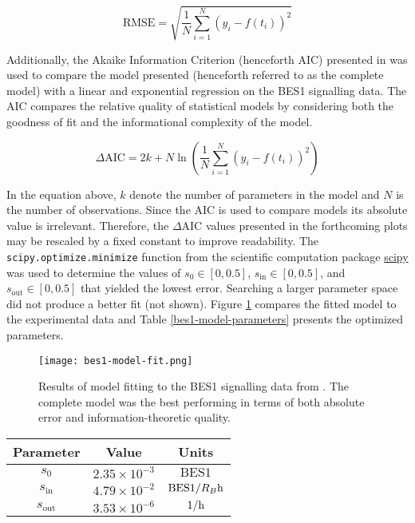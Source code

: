 \begin{equation}
\label{rmse}
\text{RMSE} =  \sqrt{\frac{1}{N}\sum_{i = 1}^{N} (y_{i} - f(t_{i}))^{2}}
\end{equation}


Additionally, the Akaike Information Criterion (henceforth AIC) presented in \cite{akaike1974} was used to compare the model presented (henceforth referred to as the complete model) with a linear and exponential regression on the BES1 signalling data. The AIC compares the relative quality of statistical models by considering both the goodness of fit and the informational complexity of the model. 

\begin{equation}
\label{aic}
\Delta \text{AIC} = 2k + N \ln\left( \frac{1}{N} \sum_{i = 1}^{N} (y_{i} - f(t_{i}))^{2}  \right) 
\end{equation}

In the equation above, $k$ denote the number of parameters in the model and $N$ is the number of observations. Since the AIC is used to compare models its absolute value is irrelevant. Therefore, the $\Delta \text{AIC}$ values presented in the forthcoming plots may be rescaled by a fixed constant to improve readability. The \verb|scipy.optimize.minimize| function from the scientific computation package \href{https://scipy.org/}{scipy} was used to determine the values of $s_{0} \in [0, 0.5]$, $s_{\text{in}} \in [0, 0.5]$, and $s_{\text{out}} \in [0, 0.5]$ that yielded the lowest error. Searching a larger parameter space did not produce a better fit (not shown).  Figure \ref{fig:bes1-model-fit} compares the fitted model to the experimental data and Table \ref{bes1-model-parameters} presents the optimized parameters. 

\begin{figure}
    \centering
    \texttt{[image: bes1-model-fit.png]}
    \caption{Results of model fitting to the BES1 signalling data from \cite{vukasinovic2021}. The complete model was the best performing in terms of both absolute error and information-theoretic quality. } 
    \label{fig:bes1-model-fit}
\end{figure}

\medskip

\begin{center}
\label{bes1-model-parameters}
\begin{tabular}{ |c|c|c| } 
 \hline
 Parameter & Value & Units \\
 \hline
 $s_{0}$ & $2.35 \times 10^{-3}$ & $\text{BES1}$  \\
 $s_{\text{in}}$ & $4.79 \times 10^{-2}$ & $\text{BES1}/R_{B}\h$ \\ 
 $s_{\text{out}}$ & $3.53 \times 10^{-6}$ & $1/\h$ \\
 \hline
\end{tabular}
\end{center}

